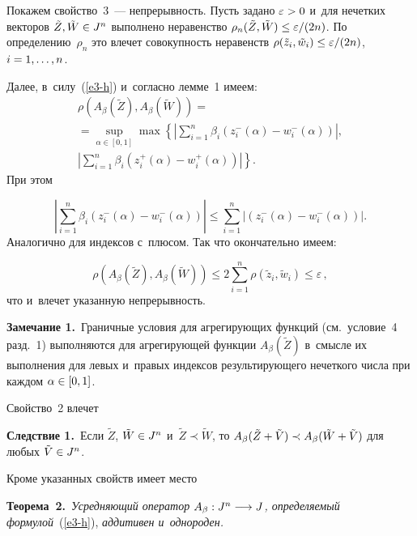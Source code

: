 \begin{multicols}{2}
Покажем свойство~3~--- непрерывность. Пусть задано $\varepsilon\hm>0$ и~для 
нечетких векторов $ \tilde{Z}, \tilde{W}\hm\in J^n$ выполнено неравенство 
$\rho_n(\tilde{Z}, \tilde{W})\hm\leq \varepsilon/(2n)$. По определению~$\rho_n$ это 
влечет совокупность неравенств $\rho(\tilde{z}_i, \tilde{w}_i)\hm\leq 
\varepsilon/(2n)$, $i\hm=1,\ldots,n$.

Далее, в~силу~(\ref{e3-h}) и~согласно лемме~1 имеем:
\begin{multline*}
\rho\left(A_{\beta}\left(\tilde{Z}\right), A_{\beta}\left(\tilde{W}\right)\right) = {}\\
{}=\sup\limits_{\alpha\in 
[0,1]}\max\left\{ \left\vert \sum\limits_{i=1}^n\beta_i(z^{-}_i(\alpha)-w^{-}_i(\alpha))\right\vert, \right.\\
\left.
\left\vert \sum\limits_{i=1}^n\beta_i(z^{+}_i(\alpha)-w^{+}_i(\alpha))\right\vert
\right\}.
\end{multline*}
При этом

\noindent
$$
\left\vert \sum\limits_{i=1}^n \beta_i\left(z^{-}_i(\alpha)-w^{-}_i(\alpha)\right)\right\vert \leq 
\sum\limits_{i=1}^n \left\vert \left(z^{-}_i(\alpha)-w^{-}_i(\alpha)\right)\right\vert.
$$
Аналогично для индексов с~плюсом. Так что окончательно имеем:

\noindent
$$
\rho\left(A_{\beta}(\tilde{Z}), A_{\beta}(\tilde{W})\right)\leq 2\sum\limits_{i=1}^n\rho
\left(\tilde{z}_i, \tilde{w}_i\right)\leq\varepsilon\,,
$$
что и~влечет указанную непрерывность.


\noindent
\textbf{Замечание 1.}\ Граничные условия  для агрегирующих функций  (см.\ условие~4 разд.~1) выполняются для агрегирующей функции $A_{\beta}(\tilde{Z})$
 в~смысле их выполнения для  левых и~правых индексов ре\-зуль\-ти\-ру\-юще\-го нечеткого 
чис\-ла при каждом $\alpha\hm\in[0, 1]$.

Свойство~2 влечет

\smallskip

\noindent
\textbf{Следствие 1.}\ Если $\tilde{Z}$, $\tilde{W}\hm\in J^n$ и~$\tilde{Z}\prec 
\tilde{W}$, то $A_{\beta}(\tilde{Z}\hm + \tilde{V})\hm\prec A_{\beta}(\tilde{W} \hm+ 
\tilde{V})$ для любых $\tilde{V}\hm\in J^n$.

\smallskip

Кроме указанных свойств имеет место

\smallskip

\noindent
\textbf{Теорема~2.}\ \textit{Усредняющий оператор $A_{\beta}: J^n\hm\longrightarrow 
J$, определяемый формулой}~(\ref{e3-h}), \textit{аддитивен и~однороден.}


\end{multicols}
